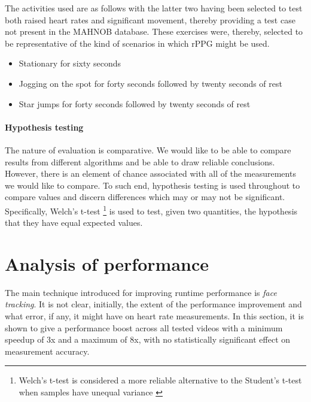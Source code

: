 The activities used are as follows with the latter two having been selected to test both raised heart rates and significant movement, thereby providing a test case not present in the MAHNOB database.
These exercises were, thereby, selected to be representative of the kind of scenarios in which rPPG might be used.
\begin{itemize}
   \item Stationary for sixty seconds
   \item Jogging on the spot for forty seconds followed by twenty seconds of rest
   \item Star jumps for forty seconds followed by twenty seconds of rest
\end{itemize}





\paragraph{Hypothesis testing}
The nature of evaluation is comparative. We would like to be able to compare results from different algorithms and be able to draw reliable conclusions. However, there is an element of 
chance associated with all of the measurements we would like to compare.
To such end, hypothesis testing is used throughout to compare values and discern differences which may or may not be significant.
Specifically, Welch's t-test \cite{welch-t-test}\footnote{Welch's t-test is considered a more reliable alternative to the Student's t-test when samples have unequal variance \cite{superior-welch}}
is used to test, given two quantities, the hypothesis that they have equal expected values. 


\section{Analysis of performance}
\label{section:face_tracking}
The main technique introduced for improving runtime performance is \textit{face tracking}. It is not clear, initially, the extent of the performance improvement and what error, if any, it might have 
on heart rate measurements. In this section, it is shown to give a performance boost across all tested videos with a minimum speedup of 3x and a maximum of 8x, with no statistically significant effect on measurement accuracy.

